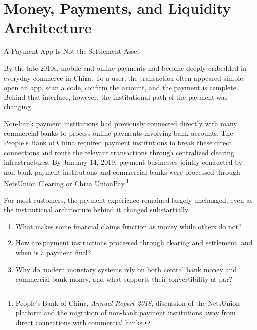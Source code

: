 \chapter{Money, Payments, and Liquidity Architecture}
\label{chap:Money_Payments_and_Liquidity_Architecture}

\begin{openingcase}{A Payment App Is Not the Settlement Asset}

By the late 2010s, mobile and online payments had become deeply embedded in everyday commerce in China. To a user, the transaction often appeared simple: open an app, scan a code, confirm the amount, and the payment is complete. Behind that interface, however, the institutional path of the payment was changing.

Non-bank payment institutions had previously connected directly with many commercial banks to process online payments involving bank accounts. The People's Bank of China required payment institutions to break these direct connections and route the relevant transactions through centralized clearing infrastructures. By January 14, 2019, payment businesses jointly conducted by non-bank payment institutions and commercial banks were processed through NetsUnion Clearing or China UnionPay.\footnote{People's Bank of China, \emph{Annual Report 2018}, discussion of the NetsUnion platform and the migration of non-bank payment institutions away from direct connections with commercial banks.}

For most customers, the payment experience remained largely unchanged, even as the institutional architecture behind it changed substantially.

\end{openingcase}


\begin{tcolorbox}[
  enhanced,
  colback=FinanceBlue!6,
  colframe=FinanceBlue,
  boxrule=0.6pt,
  sharp corners,
  left=8pt,
  right=8pt,
  top=7pt,
  bottom=7pt,
  before skip=1em,
  after skip=1.6em,
  title=\textbf{Core Questions},
  coltitle=white,
  colbacktitle=FinanceBlue,
  fonttitle=\bfseries,
  attach boxed title to top left={xshift=6pt,yshift=-2mm},
  boxed title style={
    boxrule=0pt,
    sharp corners,
    left=5pt,
    right=5pt,
    top=2pt,
    bottom=2pt
  }
]
\begin{enumerate}[
  leftmargin=*,
  label=\textcolor{FinanceBlue}{\textbf{\arabic*.}},
  itemsep=0.55em,
  topsep=0.2em
]
\item What makes some financial claims function as money while others do not?
\item How are payment instructions processed through clearing and settlement, and when is a payment final?
\item Why do modern monetary systems rely on both central bank money and commercial bank money, and what supports their convertibility at par?
\end{enumerate}
\end{tcolorbox}

